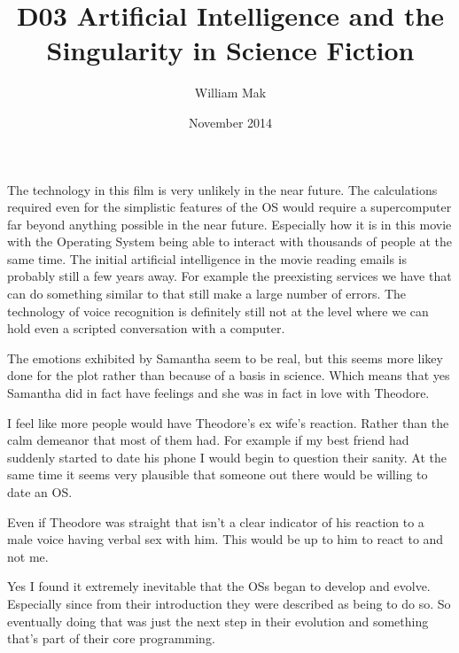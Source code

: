\documentclass{article}
\title{D03 Artificial Intelligence and the Singularity in Science Fiction}
\author{William Mak}
\date{November 2014}
\begin{document}
The technology in this film is very unlikely in the near future. The
calculations required even for the simplistic features of the OS would require a
supercomputer far beyond anything possible in the near future. Especially how it
is in this movie with the Operating System being able to interact with thousands
of people at the same time. The initial artificial intelligence in the movie
reading emails is probably still a few years away. For example the preexisting
services we have that can do something similar to that still make a large number
of errors. The technology of voice recognition is definitely still not at the
level where we can hold even a scripted conversation with a computer. 

The emotions exhibited by Samantha seem to be real, but this seems more likey
done for the plot rather than because of a basis in science. Which means that
yes Samantha did in fact have feelings and she was in fact in love with
Theodore.

I feel like more people would have Theodore's ex wife's reaction. Rather than
the calm demeanor that most of them had. For example if my best friend had
suddenly started to date his phone I would begin to question their sanity. At
the same time it seems very plausible that someone out there would be willing to
date an OS.

Even if Theodore was straight that isn't a clear indicator of his reaction to a
male voice having verbal sex with him. This would be up to him to react to and
not me.

Yes I found it extremely inevitable that the OSs began to develop and evolve.
Especially since from their introduction they were described as being to do so.
So eventually doing that was just the next step in their evolution and something
that's part of their core programming.
\end{document}
